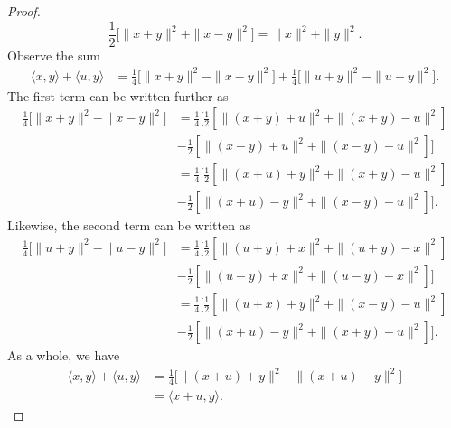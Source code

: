 \documentclass[a4paper]{article}
\begin{document}
\begin{enumerate}
\begin{proof}
        \[  \frac{ 1 }{ 2 } \Big[ \|x  + y\|^{2} + \|x - y \|^{2} \Big] = \|x\|^{2} + \|y\|^{2}. \]
        Observe the sum
        \begin{align*}
            \langle x , y \rangle + \langle u , y \rangle &= \frac{ 1 }{ 4 }  \Big[ \|x  +y\|^{2} - \|x -y\|^{2} \Big] + \frac{ 1 }{ 4 }  \Big[ \| u + y\|^{2} - \|u -y\|^{2}\Big].
        \end{align*}
        The first term can be written further as
        \begin{align*}
            \frac{ 1 }{ 4 }  \Big[ \|x + y\|^{2} - \|x-y\|^{2} \Big] &= \frac{ 1 }{ 4 }  \Big[ \frac{ 1 }{ 2 }  [ \|(x+y) + u\|^{2} + \|(x+y) - u\|^{2} ] \\
                                                                     &- \frac{ 1 }{ 2 }  [ \|(x-y) + u\|^{2} + \|(x-y) - u\|^{2}] \Big] \\
                                &= \frac{ 1 }{ 4 }  \Big[ \frac{ 1 }{ 2 }  [ \|(x+u) + y\|^{2} + \|(x+y) - u\|^{2} ] \\
                                                                     &- \frac{ 1 }{ 2 }  [ \|(x+u) - y\|^{2} + \|(x-y) - u\|^{2}] \Big].
        \end{align*}
        Likewise, the second term can be written as 
        \begin{align*}
            \frac{ 1  }{ 4  } \Big[ \|u +y\|^{2} - \|u - y\|^{2} \Big] &=   \frac{ 1 }{ 4 }  \Big[ \frac{ 1 }{ 2 }  [ \|(u+y) + x\|^{2} + \|(u+y) -x \|^{2}   ] \\
                                                                       &- \frac{ 1 }{ 2 }  [ \|(u-y) + x \|^{2} + \|(u-y) - x\|^{2}] \Big] \\
                                                                       &=   \frac{ 1 }{ 4 }  \Big[ \frac{ 1 }{ 2 }  [ \|(u+x) + y\|^{2} + \|(x-y) - u \|^{2}   ] \\
                                                                       &- \frac{ 1 }{ 2 }  [ \|(x+u) - y \|^{2} + \|(x+y) - u\|^{2}] \Big].
        \end{align*}
        As a whole, we have
        \begin{align*}
            \langle x  , y \rangle + \langle u , y \rangle &= \frac{ 1 }{ 4 } \Big[ \| (x+u) + y \|^{2} - \|(x+u) - y\|^{2} \Big] \\
            &= \langle x + u  , y \rangle.
        \end{align*}
        \end{proof}

\end{enumerate}
\end{document}
